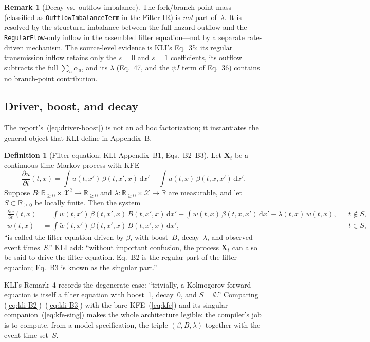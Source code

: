 \documentclass[11pt,leqno]{article}
\newcommand{\Xr}{\mathbf{X}}        %
\newcommand{\Xspace}{\mathcal{X}}   %
\newcommand{\Rp}{\mathbb{R}_{\ge 0}}
\newcommand{\dd}[1]{\,\mathrm{d}{#1}}
\newcommand{\code}[1]{\texttt{#1}}
\theoremstyle{plain}
\theoremstyle{definition}
\newtheorem{definition}[theorem]{Definition}
\newtheorem{remark}[theorem]{Remark}
\begin{document}
\begin{remark}[Decay vs.\ outflow imbalance]
The fork/branch-point mass (classified as \code{OutflowImbalanceTerm}
in the Filter IR) is \emph{not} part of~$\lambda$.  It is resolved by
the structural imbalance between the full-hazard outflow and the
\code{RegularFlow}-only inflow in the assembled filter equation---not
by a separate rate-driven mechanism.  The source-level evidence is
KLI's Eq.~35: its regular transmission inflow retains only the $s = 0$
and $s = 1$ coefficients, its outflow subtracts the full
$\sum_u \alpha_u$, and its $\lambda$ (Eq.~47, and the $\psi I$ term of
Eq.~36) contains no branch-point contribution.
\end{remark}

\subsection{Driver, boost, and decay}
\label{sec:driver-boost-decay}

The report's~(\ref{eq:driver-boost}) is not an ad hoc factorization; it
instantiates the general object that KLI define in Appendix~B.

\begin{definition}[Filter equation; KLI Appendix~B1, Eqs.~B2--B3]
\label{def:filter-eq}
Let $\Xr_t$ be a continuous-time Markov process with KFE
\[
  \frac{\partial u}{\partial t}(t,x)
  = \int u(t,x')\,\beta(t,x',x)\dd{x'}
  - \int u(t,x)\,\beta(t,x,x')\dd{x'}.
\]
Suppose $B : \Rp \times \Xspace^2 \to \Rp$ and
$\lambda : \Rp \times \Xspace \to \mathbb{R}$ are measurable, and let
$S \subset \Rp$ be locally finite.  Then the system
\begin{align}
  \frac{\partial w}{\partial t}(t,x)
    &= \int w(t,x')\,\beta(t,x',x)\,B(t,x',x)\dd{x'}
     - \int w(t,x)\,\beta(t,x,x')\dd{x'}
     - \lambda(t,x)\,w(t,x),
    && t \notin S, \label{eq:kli-B2}\\
  w(t,x)
    &= \int \tilde{w}(t,x')\,\beta(t,x',x)\,B(t,x',x)\dd{x'},
    && t \in S, \label{eq:kli-B3}
\end{align}
``is called the filter equation driven by $\beta$, with boost~$B$,
decay~$\lambda$, and observed event times~$S$.''  KLI add: ``without
important confusion, the process $\Xr_t$ can also be said to drive the
filter equation.  Eq.~B2 is the regular part of the filter equation;
Eq.~B3 is known as the singular part.''
\end{definition}

KLI's Remark~4 records the degenerate case: ``trivially, a Kolmogorov
forward equation is itself a filter equation with boost~1, decay~0, and
$S = \emptyset$.''  Comparing (\ref{eq:kli-B2})--(\ref{eq:kli-B3}) with
the bare KFE~(\ref{eq:kfe}) and its singular
companion~(\ref{eq:kfe-sing}) makes the whole architecture legible: the
compiler's job is to compute, from a model specification, the triple
$(\beta, B, \lambda)$ together with the event-time set~$S$.
\end{document}
